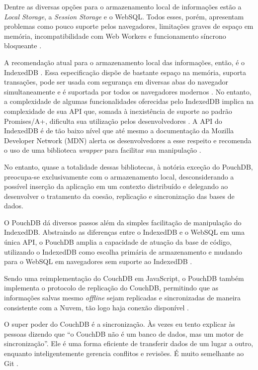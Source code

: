 \documentclass[
	article,			%
	11pt,				%
	oneside,			%
	a4paper,			%
	english,			%
	brazil,				%
	sumario=tradicional
	]{abntex2}
\begin{document}
Dentre as diversas opções para o armazenamento local de informações estão a \textit{Local Storage}, a \textit{Session Storage} e o WebSQL. Todos esses, porém, apresentam problemas como pouco suporte pelos navegadores, limitações graves de espaço em memória, incompatibilidade com Web Workers e funcionamento síncrono bloqueante \cite{osmani-cohen-2017}.

A recomendação atual para o armazenamento local das informações, então, é o IndexedDB \cite{osmani-cohen-2017}. Essa especificação dispõe de bastante espaço na memória, suporta transações, pode ser usada com segurança em diversas abas do navegador simultaneamente e é suportada por todos os navegadores modernos \cite{tabalin-2017}. No entanto, a complexidade de algumas funcionalidades oferecidas pelo IndexedDB implica na complexidade de sua API que, somada à inexistência de suporte ao padrão Promises/A+, dificulta sua utilização pelos desenvolvedores \cite{osmani-2016}. A API do IndexedDB é de tão baixo nível que até mesmo a documentação da Mozilla Developer Network (MDN) alerta os desenvolvedores a esse respeito e recomenda o uso de uma biblioteca \textit{wrapper} para facilitar sua manipulação \cite{smith-2016}.

No entanto, quase a totalidade dessas bibliotecas, à notória exceção do PouchDB, preocupa-se exclusivamente com o armazenamento local, desconsiderando a possível inserção da aplicação em um contexto distribuído e delegando ao desenvolver o tratamento da coesão, replicação e sincronização das bases de dados.

O PouchDB dá diversos passos além da simples facilitação de manipulação do IndexedDB. Abstraindo as diferenças entre o IndexedDB e o WebSQL em uma única API, o PouchDB amplia a capacidade de atuação da base de código, utilizando o IndexedDB como escolha primária de armazenamento e mudando para o WebSQL em navegadores sem suporte ao IndexedDB \cite{brown-2014}.

Sendo uma reimplementação do CouchDB em JavaScript, o PouchDB também implementa o protocolo de replicação do CouchDB, permitindo que as informações salvas mesmo \textit{offline} sejam replicadas e sincronizadas de maneira consistente com a Nuvem, tão logo haja conexão disponível \cite{pouchdb-2017}.

\begin{citacao}
	O super poder do CouchDB é a sincronização. Às vezes eu tento explicar às pessoas dizendo que “o CouchDB não é um banco de dados, mas um motor de sincronização”. Ele é uma forma eficiente de transferir dados de um lugar a outro, enquanto inteligentemente gerencia conflitos e revisões. É muito semelhante ao Git \cite{lawson-2017}.
\end{citacao}
\end{document}
